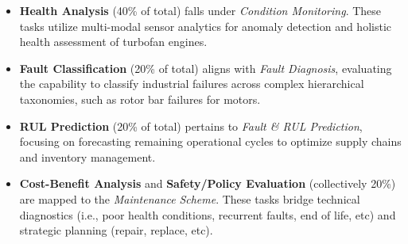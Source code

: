 \documentclass[sigconf, screen, nonacm]{acmart}
\begin{document}
\begin{itemize} \item \textbf{Health Analysis} (40\% of total) falls under \textit{Condition Monitoring}. These tasks utilize multi-modal sensor analytics for anomaly detection and holistic health assessment of turbofan engines.

\item \textbf{Fault Classification} (20\% of total) aligns with \textit{Fault Diagnosis}, evaluating the capability to classify industrial failures across complex hierarchical taxonomies, such as rotor bar failures for motors. 

\item \textbf{RUL Prediction} (20\% of total) pertains to \textit{Fault \& RUL Prediction}, focusing on forecasting remaining operational cycles to optimize supply chains and inventory management. 

\item \textbf{Cost-Benefit Analysis} and \textbf{Safety/Policy Evaluation} (collectively 20\%) are mapped to the \textit{Maintenance} \textit{Scheme}. These tasks bridge technical diagnostics (i.e., poor health conditions, recurrent faults, end of life, etc) and strategic planning (repair, replace, etc). 
\end{itemize}

\end{document}
